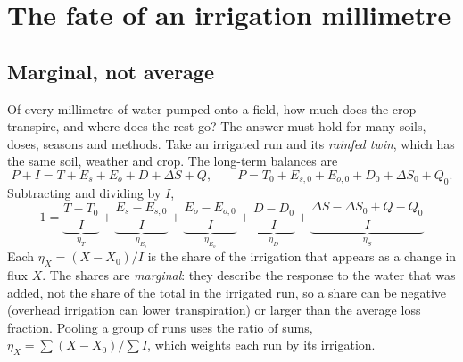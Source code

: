 \chapter{The fate of an irrigation millimetre}\label{ch:fate}

\section{Marginal, not average}
Of every millimetre of water pumped onto a field, how much does the crop transpire, and where does the rest go? The answer must hold for many soils, doses, seasons and methods. Take an irrigated run and its \emph{rainfed twin}, which has the same soil, weather and crop. The long-term balances are
\begin{equation}\label{eq:twin}\boxed{P+I=T+E_s+E_o+D+\Delta S+Q,\qquad P=T_0+E_{s,0}+E_{o,0}+D_0+\Delta S_0+Q_0 .}\end{equation}
Subtracting and dividing by $I$,
\begin{equation}\label{eq:fate}
\boxed{\;1=\underbrace{\frac{T-T_0}{I}}_{\eta_T}+\underbrace{\frac{E_s-E_{s,0}}{I}}_{\eta_{E_s}}+\underbrace{\frac{E_o-E_{o,0}}{I}}_{\eta_{E_o}}+\underbrace{\frac{D-D_0}{I}}_{\eta_D}+\underbrace{\frac{\Delta S-\Delta S_0+Q-Q_0}{I}}_{\eta_S}\;}
\end{equation}
Each $\eta_X=(X-X_0)/I$ is the share of the irrigation that appears as a change in flux $X$. The shares are \emph{marginal}: they describe the response to the water that was added, not the share of the total in the irrigated run, so a share can be negative (overhead irrigation can lower transpiration) or larger than the average loss fraction. Pooling a group of runs uses the ratio of sums, $\eta_X=\sum(X-X_0)/\sum I$, which weights each run by its irrigation.




